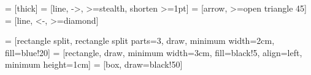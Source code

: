   = [thick]
 = [line, ->, >=stealth, shorten >=1pt]
 = [arrow, >=open triangle 45]   %
 = [line, <-, >=diamond]           %

 = [rectangle split, rectangle split parts=3, draw, minimum width=2cm, fill=blue!20] %
 = [rectangle, draw, minimum width=3cm, fill=black!5, align=left, minimum height=1cm]
 = [box, draw=black!50]
